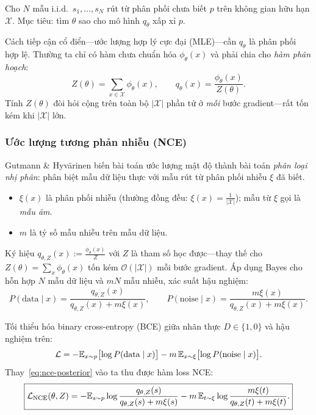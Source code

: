 Cho $N$ mẫu i.i.d.\ $s_1,\ldots,s_N$ rút từ phân phối chưa biết $p$ trên không gian hữu hạn $\mathcal{X}$. Mục tiêu: tìm $\theta$ sao cho mô hình $q_\theta$ xấp xỉ $p$.

Cách tiếp cận cổ điển---ước lượng hợp lý cực đại (MLE)---cần $q_\theta$ là phân phối hợp lệ. Thường ta chỉ có hàm chưa chuẩn hóa $\phi_\theta(x)$ và phải chia cho \emph{hàm phân hoạch}:
\begin{equation}
Z(\theta) = \sum_{x \in \mathcal{X}} \phi_\theta(x), \qquad q_\theta(x) = \frac{\phi_\theta(x)}{Z(\theta)}.
\label{eq:partition-function}
\end{equation}
Tính $Z(\theta)$ đòi hỏi cộng trên toàn bộ $|\mathcal{X}|$ phần tử ở \emph{mỗi} bước gradient---rất tốn kém khi $|\mathcal{X}|$ lớn.

\subsubsection{Ước lượng tương phản nhiễu (NCE)}
\label{sec:nce-def}

Gutmann \& Hyvärinen \cite{gutmann2010nce} biến bài toán ước lượng mật độ thành bài toán \emph{phân loại nhị phân}: phân biệt mẫu dữ liệu thực với mẫu rút từ phân phối nhiễu $\xi$ đã biết.

\begin{itemize}
  \item $\xi(x)$ là phân phối nhiễu (thường đồng đều: $\xi(x)=\frac{1}{|\mathcal{X}|}$); mẫu từ $\xi$ gọi là \emph{mẫu âm}.
  \item $m$ là tỷ số mẫu nhiễu trên mẫu dữ liệu.
\end{itemize}

Ký hiệu $q_{\theta,Z}(x) := \frac{\phi_\theta(x)}{Z}$ với $Z$ là tham số học được---thay thế cho $Z(\theta) = \sum_x\phi_\theta(x)$ tốn kém $\mathcal{O}(|\mathcal{X}|)$ mỗi bước gradient. Áp dụng Bayes cho hỗn hợp $N$ mẫu dữ liệu và $mN$ mẫu nhiễu, xác suất hậu nghiệm:
\begin{equation}
\boxed{
P(\text{data} \mid x) = \frac{q_{\theta,Z}(x)}{q_{\theta,Z}(x) + m\xi(x)}, \qquad
P(\text{noise} \mid x) = \frac{m\xi(x)}{q_{\theta,Z}(x) + m\xi(x)}.
}
\label{eq:nce-posterior}
\end{equation}

Tối thiểu hóa binary cross-entropy (BCE) giữa nhãn thực $D \in \{1,0\}$ và hậu nghiệm trên:
\[
  \mathcal{L} = -\mathbb{E}_{x \sim p}\bigl[\log P(\text{data}\mid x)\bigr]
              - m\,\mathbb{E}_{x \sim \xi}\bigl[\log P(\text{noise}\mid x)\bigr].
\]
Thay~\eqref{eq:nce-posterior} vào ta thu được hàm loss NCE:
\begin{equation}
\boxed{
\mathcal{L}_{\text{NCE}}(\theta, Z) = -\mathbb{E}_{s \sim p}\log\frac{q_{\theta,Z}(s)}{q_{\theta,Z}(s) + m\xi(s)}
- m\,\mathbb{E}_{t \sim \xi}\log\frac{m\xi(t)}{q_{\theta,Z}(t) + m\xi(t)}.
}
\label{eq:nce-loss}
\end{equation}

